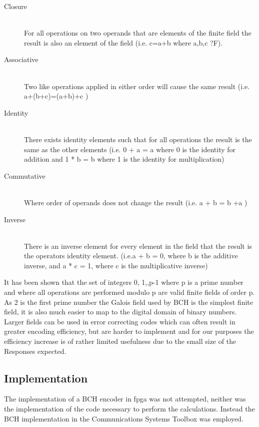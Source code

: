 \begin{description}
\item[Closure] \hfill \\
For all operations on two operands that are elements of the finite field the
result is also an element of the field (i.e.  c=a+b where a,b,c ?F).
\item[Associative] \hfill \\
Two like operations applied in either order will cause the same result
(i.e.  a+(b+c)=(a+b)+c )  
\item[Identity] \hfill \\
There exists identity elements such that for all operations the result is the
same as the other elements (i.e. 0 + a = a where 0 is the identity for addition
and 1 * b = b where 1 is the identity for multiplication)
\item[Commutative] \hfill \\
Where order of operands does not change the result (i.e. a + b = b +a )
\item[Inverse] \hfill \\
There is an inverse element for every element in the field that the result is
the operators identity element. (i.e.a + b = 0, where b is the additive
inverse, and  a * c = 1, where c is the multiplicative inverse)
\end{description}

It has been shown that the set of integers {0, 1,,p-1} where p is a prime
number and where all operations are performed modulo p are valid finite fields
of order p.
As 2 is the first prime number the Galois field used by BCH is the simplest
finite field, it is also much easier to map to the digital domain of binary
numbers.
Larger fields can be used in error correcting codes which can often result in
greater encoding efficiency, but are harder to implement and for our purposes
the efficiency increase is of rather limited usefulness due to the small size
of the Responses expected.

\subsection{Implementation}

The implementation of a BCH encoder in \gls{fpga} was not attempted, neither was the
implementation of the \matlab code necessary to perform the calculations.
Instead the BCH implementation in the \matlab Communications Systems Toolbox was employed.

